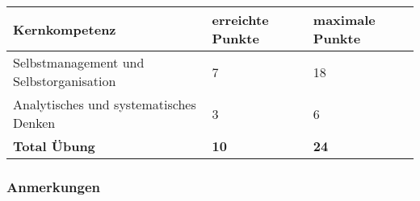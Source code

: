 \begin{center}
  \begin{tabular}{ | p{7cm} | p{3cm} | p{3cm} |}
   \hline
   \textbf{Kernkompetenz} & \textbf{erreichte Punkte} & \textbf{maximale Punkte} \\ \hline
   Selbstmanagement und Selbstorganisation & 7 & 18\\ \hline
   Analytisches und systematisches Denken & 3 & 6\\ \hline
   \textbf{Total Übung} & \textbf{10} & \textbf{24}\\ \hline
  \end{tabular}
\end{center}

\subsubsection{Anmerkungen}